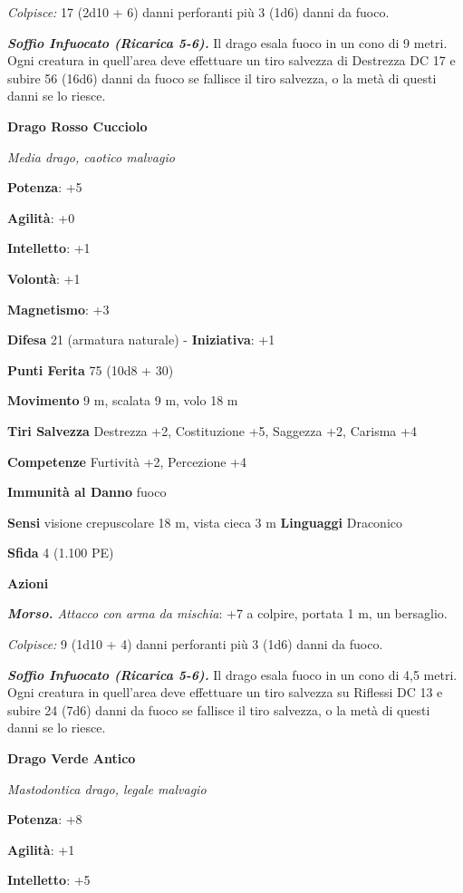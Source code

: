 \begin{multicols}{2}
\emph{Colpisce:} 17 (2d10 + 6) danni perforanti più 3 (1d6) danni da
fuoco.

\emph{\textbf{Soffio Infuocato (Ricarica 5-6).}} Il drago esala fuoco in
un cono di 9 metri. Ogni creatura in quell'area deve effettuare un tiro
salvezza di Destrezza DC 17 e subire 56 (16d6) danni da fuoco se
fallisce il tiro salvezza, o la metà di questi danni se lo riesce.

\textbf{Drago Rosso Cucciolo}

\emph{Media drago, caotico malvagio}

\textbf{Potenza}: +5

\textbf{Agilità}: +0

\textbf{Intelletto}: +1

\textbf{Volontà}: +1

\textbf{Magnetismo}: +3

\textbf{Difesa} 21 (armatura naturale) - \textbf{Iniziativa}: +1

\textbf{Punti Ferita} 75 (10d8 + 30)

\textbf{Movimento} 9 m, scalata 9 m, volo 18 m

\textbf{Tiri Salvezza} Destrezza +2, Costituzione +5, Saggezza +2,
Carisma +4

\textbf{Competenze} Furtività +2, Percezione +4

\textbf{Immunità al Danno} fuoco

\textbf{Sensi} visione crepuscolare 18 m, vista cieca 3 m
\textbf{Linguaggi} Draconico

\textbf{Sfida} 4 (1.100 PE)\smallskip

\smallskip\textbf{Azioni}

\emph{\textbf{Morso.} Attacco con arma da mischia}: +7 a colpire,
portata 1 m, un bersaglio.

\emph{Colpisce:} 9 (1d10 + 4) danni perforanti più 3 (1d6) danni da
fuoco.

\emph{\textbf{Soffio Infuocato (Ricarica 5-6).}} Il drago esala fuoco in
un cono di 4,5 metri. Ogni creatura in quell'area deve effettuare un
tiro salvezza su Riflessi DC 13 e subire 24 (7d6) danni da fuoco se
fallisce il tiro salvezza, o la metà di questi danni se lo riesce.

\textbf{Drago Verde Antico}

\emph{Mastodontica drago, legale malvagio}

\textbf{Potenza}: +8

\textbf{Agilità}: +1

\textbf{Intelletto}: +5


\end{multicols}
